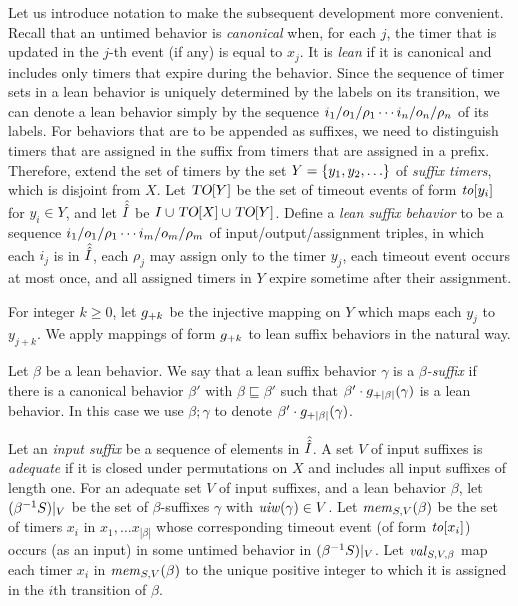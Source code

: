 Let us introduce notation to make the subsequent development more convenient. 
Recall that an untimed behavior is \emph{canonical} when, for each $j$,
the timer that is updated in the $j$-th event (if any) is equal to $x_j$.
It is {\em lean} if it is canonical and
includes only timers that expire during the behavior. 
Since the sequence of timer sets in a lean behavior is
uniquely determined by the labels on its transition, we can
denote a lean behavior simply by the sequence
$i_1/o_1/\rho_1 \cdots i_n/o_n/\rho_n$ of its labels.
For behaviors that are to be appended as suffixes, we need to distinguish
timers that are assigned in the suffix from timers that are assigned in a prefix.
Therefore, extend the set of timers by the set $Y = \lbrace y_1,y_2,\ldots\rbrace$ of
{\em suffix timers}, which is disjoint from $X$.
Let $\mbox{\sl TO}[Y]$ be the set of timeout events of form
$\mathit{to}[y_i]$ for $y_i \in Y$, and let
$\hat{\hat{I}}$ be $I \cup \mbox{\sl TO}[X] \cup \mbox{\sl TO}[Y]$.
Define a {\em lean suffix behavior} to be a sequence
$i_1/o_1/\rho_1 \cdots i_m/o_m/\rho_m$ of input/output/assignment triples,
in which each $i_j$ is in $\hat{\hat{I}}$, 
each $\rho_j$ may assign only to the timer $y_j$,
each timeout event occurs at most once,
and all assigned timers in $Y$ expire sometime after their assignment.

For integer $k \geq 0$, let $g_{+{k}}$ be the injective mapping on
$Y$ which maps each $y_j$ to $y_{j+k}$.  We apply mappings of form
$g_{+{k}}$ to lean suffix behaviors in the natural way.

Let $\beta$ be a lean behavior. We say that 
a lean suffix behavior $\gamma$ is a {\em $\beta$-suffix} if
there is a canonical behavior $\beta'$ with $\beta \sqsubseteq \beta'$ such that
$\beta'\cdot g_{+{|\beta|}}(\gamma)$ is a lean behavior. In this case we
use $\beta;\gamma$ to denote $\beta'\cdot g_{+{|\beta|}}(\gamma)$.

Let an {\em input suffix} be a sequence of elements in $\hat{\hat{I}}$.
A set $V$ of input suffixes is {\em adequate} if it is closed under permutations
on $X$ and includes all input suffixes of length one.
For an adequate set $V$ of input suffixes, and a lean behavior $\beta$,
let $({\beta}^{-1}{S})|_{V}$ be the set of $\beta$-suffixes $\gamma$
with $\mathit{uiw}(\gamma) \in V$.
Let $\mathit{mem}_{S,V}(\beta)$ be the set of timers $x_i$ in
$x_1 , \ldots x_{|\beta|}$ whose corresponding timeout event
(of form $\mathit{to}[x_i]$) occurs (as an input) in some untimed behavior in
$({\beta}^{-1}{S})|_{V}$.
Let $\mathit{val}_{S,V,\beta}$ map each timer $x_i$ in
$\mathit{mem}_{S,V}(\beta)$ to the unique positive integer to which it
is assigned in the $i$th transition of $\beta$.


